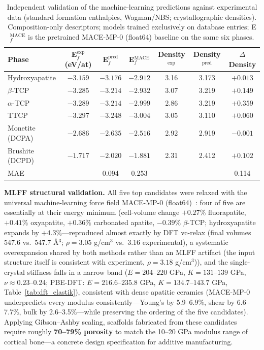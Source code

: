 \documentclass[review,11pt,a4paper]{elsarticle}
\begin{document}
\begin{table}[ht]
\centering\small
\caption{Independent validation of the machine-learning predictions against experimental data (standard formation enthalpies, Wagman/NBS; crystallographic densities). Composition-only descriptors; models trained exclusively on database entries; E$_f^{\mathrm{MACE}}$ is the pretrained MACE-MP-0 (float64) baseline on the same six phases.}
\label{tab:bench}
\begin{tabular}{lcccccc}
\toprule
Phase & E$_f^{\mathrm{exp}}$ (eV/at) & E$_f^{\mathrm{pred}}$ & E$_f^{\mathrm{MACE}}$ & Density$^{\mathrm{exp}}$ & Density$^{\mathrm{pred}}$ & $\Delta$Density \\
\midrule
Hydroxyapatite & $-3.159$ & $-3.176$ & $-2.912$ & 3.16 & 3.173 & $+0.013$ \\
$\beta$-TCP & $-3.285$ & $-3.214$ & $-2.932$ & 3.07 & 3.219 & $+0.149$ \\
$\alpha$-TCP & $-3.289$ & $-3.214$ & $-2.999$ & 2.86 & 3.219 & $+0.359$ \\
TTCP & $-3.297$ & $-3.248$ & $-3.004$ & 3.05 & 3.110 & $+0.060$ \\
Monetite (DCPA) & $-2.686$ & $-2.635$ & $-2.516$ & 2.92 & 2.919 & $-0.001$ \\
Brushite (DCPD) & $-1.717$ & $-2.020$ & $-1.881$ & 2.31 & 2.412 & $+0.102$ \\
\midrule
MAE & & 0.094 & 0.253 & & & 0.114 \\
\bottomrule
\end{tabular}
\end{table}

\textbf{MLFF structural validation.} All five top candidates were relaxed with the universal machine-learning force field MACE-MP-0 (float64)~\cite{batatia2022}: four of five are essentially at their energy minimum (cell-volume change $+0.27\%$ fluorapatite, $+0.41\%$ oxyapatite, $+0.36\%$ carbonated apatite, $-0.39\%$ $\beta$-TCP; hydroxyapatite expands by $+4.3\%$---reproduced almost exactly by DFT vc-relax (final volumes 547.6 vs.\ 547.7 \AA$^3$; $\rho = 3.05$ g/cm$^3$ vs.\ 3.16 experimental), a systematic overexpansion shared by both methods rather than an MLFF artifact (the input structure itself is consistent with experiment, $\rho = 3.18$ g/cm$^3$)), and the single-crystal stiffness falls in a narrow band ($E = 204$--$220$ GPa, $K = 131$--$139$ GPa, $\nu \approx 0.23$--0.24; PBE-DFT: $E = 216.6$--$235.8$ GPa, $K = 134.7$--$143.7$ GPa, Table~\ref{tab:dft_elastik}), consistent with dense apatitic ceramics (MACE-MP-0 underpredicts every modulus consistently---Young's by 5.9--6.9\%, shear by 6.6--7.7\%, bulk by 2.6--3.5\%---while preserving the ordering of the five candidates). Applying Gibson--Ashby scaling, scaffolds fabricated from these candidates require roughly \textbf{70--79\% porosity} to match the 10--20 GPa modulus range of cortical bone---a concrete design specification for additive manufacturing.
\end{document}
